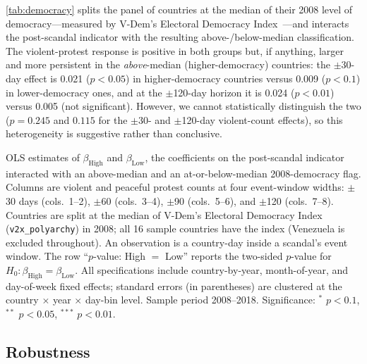 \documentclass[11pt]{article}
\let\mathbetasym\beta
\renewcommand{\beta}{\ensuremath{\mathbetasym}}
\begin{document}
\autoref{tab:democracy} splits the panel of countries at the median of their 2008 level of democracy---measured by V-Dem's Electoral Democracy Index~\citep{vdem2024}---and interacts the post-scandal indicator with the resulting above-/below-median classification. The violent-protest response is positive in both groups but, if anything, larger and more persistent in the \emph{above}-median (higher-democracy) countries: the $\pm$30-day effect is 0.021 ($p<0.05$) in higher-democracy countries versus 0.009 ($p<0.1$) in lower-democracy ones, and at the $\pm$120-day horizon it is 0.024 ($p<0.01$) versus 0.005 (not significant). However, we cannot statistically distinguish the two ($p = 0.245$ and $0.115$ for the $\pm$30- and $\pm$120-day violent-count effects), so this heterogeneity is suggestive rather than conclusive.

\begin{table}[htb!]
    \caption{Effect by 2008 level of democracy.}
    \label{tab:democracy}
    \begin{center}
        \scriptsize{}
    \end{center}
    \footnotesize{OLS estimates of $\beta_{\text{High}}$ and $\beta_{\text{Low}}$, the coefficients on the post-scandal indicator interacted with an above-median and an at-or-below-median 2008-democracy flag. Columns are violent and peaceful protest counts at four event-window widths: $\pm$30 days (cols.\ 1--2), $\pm$60 (cols.\ 3--4), $\pm$90 (cols.\ 5--6), and $\pm$120 (cols.\ 7--8). Countries are split at the median of V-Dem's Electoral Democracy Index (\texttt{v2x\_polyarchy}) in 2008; all 16 sample countries have the index (Venezuela is excluded throughout). An observation is a country-day inside a scandal's event window. The row ``$p$-value: High $=$ Low'' reports the two-sided $p$-value for $H_0:\beta_{\text{High}}=\beta_{\text{Low}}$. All specifications include country-by-year, month-of-year, and day-of-week fixed effects; standard errors (in parentheses) are clustered at the country $\times$ year $\times$ day-bin level. Sample period 2008--2018. Significance: $^{*}$ $p<0.1$, $^{**}$ $p<0.05$, $^{***}$ $p<0.01$.}
\end{table}

\subsection{Robustness}
\end{document}
